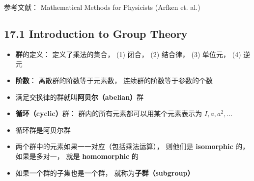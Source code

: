 
参考文献： Mathematical Methods for Physicists (Arfken et. al.)

\subsection{17.1 Introduction to Group Theory}
\begin{itemize}
\item \textbf{群}的定义： 定义了乘法的集合， (1) 闭合， (2) 结合律， (3) 单位元， (4) 逆元

\item \textbf{阶数}： 离散群的阶数等于元素数， 连续群的阶数等于参数的个数

\item 满足交换律的群就叫\textbf{阿贝尔（abelian）}群

\item \textbf{循环（cyclic）}群： 群内的所有元素都可以用某个元素表示为 $I, a, a^2, \dots$

\item 循环群是阿贝尔群

\item 两个群中的元素如果一一对应（包括乘法运算）， 则他们是 \textbf{isomorphic} 的， 如果是多对一， 就是 \textbf{homomorphic} 的

\item 如果一个群的子集也是一个群， 就称为\textbf{子群（subgroup）}
\end{itemize}
